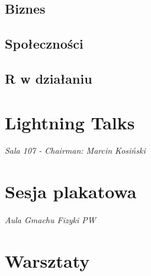 \documentclass[11pt,twoside,b5paper]{book}
\begin{document}
\section{Biznes}






\section{Społeczności}


\section{R w działaniu}





\chapter{Lightning Talks}{\LARGE \textit{Sala 107 - Chairman: Marcin Kosiński}}







\chapter{Sesja plakatowa}{\LARGE \textit{Aula Gmachu Fizyki PW}}






\chapter{Warsztaty}{}

\newpage

\newpage

\newpage

\newpage

\newpage

\newpage

\newpage

\newpage

\newpage

\newpage

\newpage

\newpage

\newpage

\newpage

\newpage

\newpage

\newpage


\backmatter
\small \printindex[a]

\clearpage\phantom{}
 \thispagestyle{empty}
\clearpage\phantom{}
 \thispagestyle{empty}


\end{document}
